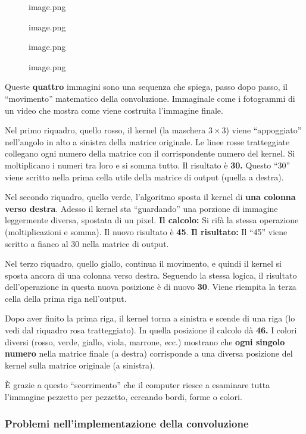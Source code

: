 \documentclass[
]{article}
\begin{document}
\begin{figure}
\centering
{image.png}
\caption{image.png}
\end{figure}

\begin{figure}
\centering
{image.png}
\caption{image.png}
\end{figure}

Queste \textbf{quattro} immagini sono una sequenza che spiega, passo dopo passo, il ``movimento'' matematico della convoluzione. Immaginale come i fotogrammi di un video che mostra come viene costruita l'immagine finale.

Nel primo riquadro, quello rosso, il kernel (la maschera \(3 \times 3\)) viene ``appoggiato'' nell'angolo in alto a sinistra della matrice originale.
Le linee rosse tratteggiate collegano ogni numero della matrice con il corrispondente numero del kernel. Si moltiplicano i numeri tra loro e si somma tutto. Il risultato è \textbf{30.} Questo ``30'' viene scritto nella prima cella utile della matrice di output (quella a destra).

Nel secondo riquadro, quello verde, l'algoritmo sposta il kernel di \textbf{una colonna verso destra}. Adesso il kernel sta ``guardando'' una porzione di immagine leggermente diversa, spostata di un pixel. \textbf{Il calcolo:} Si rifà la stessa operazione (moltiplicazioni e somma). Il nuovo risultato è \textbf{45}. \textbf{Il risultato:} Il ``45'' viene scritto a fianco al 30 nella matrice di output.

Nel terzo riquadro, quello giallo, continua il movimento, e quindi il kernel si sposta ancora di una colonna verso destra. Seguendo la stessa logica, il risultato dell'operazione in questa nuova posizione è di nuovo \textbf{30}. Viene riempita la terza cella della prima riga nell'output.

Dopo aver finito la prima riga, il kernel torna a sinistra e scende di una riga (lo vedi dal riquadro rosa tratteggiato). In quella posizione il calcolo dà \textbf{46.} I colori diversi (rosso, verde, giallo, viola, marrone, ecc.) mostrano che \textbf{ogni singolo numero} nella matrice finale (a destra) corrisponde a una diversa posizione del kernel sulla matrice originale (a sinistra).

È grazie a questo ``scorrimento'' che il computer riesce a esaminare tutta l'immagine pezzetto per pezzetto, cercando bordi, forme o colori.

\hypertarget{problemi-nellimplementazione-della-convoluzione}{%
\subsubsection{Problemi nell'implementazione della convoluzione}\label{problemi-nellimplementazione-della-convoluzione}}
\end{document}
